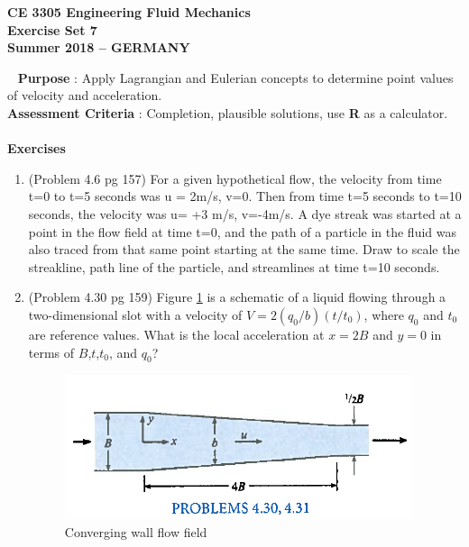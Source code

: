 \documentclass[12pt]{article}
\begin{document}
\begingroup
\begin{center}
{\textbf{{ CE 3305 Engineering Fluid Mechanics} \\ Exercise Set 7 \\ Summer 2018 -- GERMANY} }
\end{center}
\endgroup
\begingroup
~\newline
\textbf{Purpose} :  Apply Lagrangian and Eulerian concepts to determine point values of velocity and acceleration.\\
\textbf{Assessment Criteria} : Completion, plausible solutions, use \textbf{R} as a calculator. \\~\\
\textbf{Exercises}

\begin{enumerate}
\item (Problem 4.6 pg 157)
For a given hypothetical flow, the velocity from time t=0 to t=5 seconds was u = 2m/s, v=0.  
Then from time t=5 seconds to t=10 seconds, the velocity was u= +3 m/s, v=-4m/s.
A dye streak was started at a point in the flow field at time t=0, and the path of a particle in the fluid was also traced from that same point starting at the same time.
Draw to scale the streakline, path line of the particle, and streamlines at time t=10 seconds.


\item (Problem 4.30 pg 159)
Figure \ref{fig:Nozzle} is a schematic of a liquid flowing through a two-dimensional slot with a velocity of 
$V = 2(q_0/b)(t/t_0)$, where $q_0$ and $t_0$ are reference values.
What is the local acceleration at $x=2B$ and $y=0$ in terms of $B$,$t$,$t_0$, and $q_0$?

\begin{figure}[htbp] %
   \centering
   \includegraphics[width=4in]{Nozzle.jpg} 
   \caption{Converging wall flow field}
   \label{fig:Nozzle}
\end{figure}

~
\end{enumerate}
\end{document}
